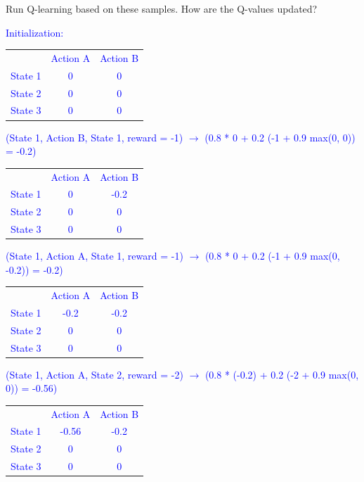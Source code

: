 \documentclass[a4paper]{article}
\newif\ifsol
\begin{document}
\begin{enumerate}
    Run Q-learning based on these samples. How are the Q-values updated? \\
    \ifsol
        \textcolor{blue}{
    Initialization:
    \begin{center}
    \begin{tabular}{ |c|c|c| } 
     \hline
             & Action A & Action B \\ 
     State 1 & 0 & 0 \\ 
     State 2 & 0 & 0 \\ 
     State 3 & 0 & 0 \\ 
     \hline
    \end{tabular}
    \end{center}
    (State 1, Action B, State 1, reward = -1)  $\rightarrow$  (0.8 * 0 + 0.2 (-1 + 0.9 max(0, 0)) = -0.2)
    \begin{center}
    \begin{tabular}{ |c|c|c| } 
     \hline
             & Action A & Action B \\ 
     State 1 & 0 & -0.2 \\ 
     State 2 & 0 & 0 \\ 
     State 3 & 0 & 0 \\ 
     \hline
    \end{tabular}
    \end{center}
    (State 1, Action A, State 1, reward = -1)  $\rightarrow$  (0.8 * 0 + 0.2 (-1 + 0.9 max(0, -0.2)) = -0.2)
    \begin{center}
    \begin{tabular}{ |c|c|c| } 
     \hline
             & Action A & Action B \\ 
     State 1 & -0.2 & -0.2 \\ 
     State 2 & 0 & 0 \\ 
     State 3 & 0 & 0 \\ 
     \hline
    \end{tabular}
    \end{center}
    (State 1, Action A, State 2, reward = -2)  $\rightarrow$  (0.8 * (-0.2) + 0.2 (-2 + 0.9 max(0, 0)) = -0.56)
    \begin{center}
    \begin{tabular}{ |c|c|c| } 
     \hline
             & Action A & Action B \\ 
     State 1 & -0.56 & -0.2 \\ 
     State 2 & 0 & 0 \\ 
     State 3 & 0 & 0 \\ 
     \hline
    \end{tabular}

\end{center}}
\end{enumerate}
\end{document}
